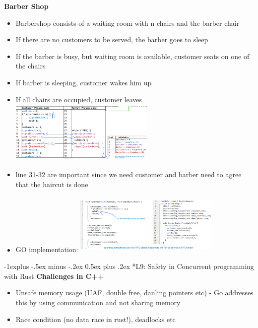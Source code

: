 \documentclass[10pt, landscape]{article}
\makeatletter
\renewcommand{\subsection}{\@startsection{subsection}{2}{0mm}%
                                {-1explus -.5ex minus -.2ex}%
                                {0.5ex plus .2ex}%
                                {\normalfont\normalsize\bfseries}}
\makeatother
\begin{document}
\begin{multicols}{4}
\textbf{Barber Shop} \\
\begin{itemize}
    \item Barbershop consists of a waiting room with n chairs and the barber chair 
    \item If there are no customers to be served, the barber goes to sleep
    \item If the barber is busy, but waiting room is available, customer seats on one of the chairs 
    \item If barber is sleeping, customer wakes him up 
    \item If all chairs are occupied, customer leaves
    \includegraphics*[width=7cm, height=3cm]{barber.png}
    \item line 31-32 are important since we need customer and barber need to agree that the haircut is done
    \item GO implementation:
    \includegraphics*[width=7cm, height=3cm]{gobarber.png}
\end{itemize}

\subsection*{L9: Safety in Concurrent programming with Rust}
\textbf{Challenges in C++} \\
\begin{itemize}
    \item Unsafe memory usage (UAF, double free, danling pointers  etc) - Go addresses this by using communication and not sharing memory
    \item Race condition (no data race in rust!), deadlocks etc 
\end{itemize}


\end{multicols}
\end{document}
